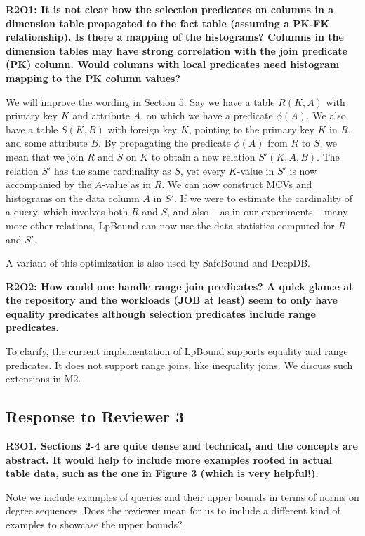 \vspace{0.5em}\noindent
\textbf{
R2O1: It is not clear how the selection predicates on columns in a dimension table propagated to the fact table (assuming a PK-FK relationship). Is there a mapping of the histograms? Columns in the dimension tables may have strong correlation with the join predicate (PK) column. Would columns with local predicates need histogram mapping to the PK column values? 
}

{
\color{blue}
We will improve the wording in Section 5. Say we have a table $R(K, A)$ with primary key $K$ and attribute $A$, on which we have a predicate $\phi(A)$. We also have a table $S(K,B)$ with foreign key $K$, pointing to the primary key $K$ in $R$, and some attribute $B$. By propagating the predicate $\phi(A)$ from $R$ to $S$, we mean that we join $R$ and $S$ on $K$ to obtain a new relation $S'(K,A,B)$. The relation $S'$ has the same cardinality as $S$, yet every $K$-value in $S'$ is now accompanied by the $A$-value as in $R$. We can now construct MCVs and histograms on the data column $A$ in $S'$. If we were to estimate the cardinality of a query, which involves both $R$ and $S$, and also -- as in our experiments -- many more other relations, LpBound can now use the data statistics computed for $R$ and $S'$.

A variant of this optimization is also used by SafeBound and DeepDB. 
}


\vspace{0.5em}\noindent
\textbf{
R2O2: How could one handle range join predicates? A quick glance at the repository and the workloads (JOB at least) seem to only have equality predicates although selection predicates include range predicates. 
}

{
\color{blue}
To clarify, the current implementation of LpBound supports equality and range predicates. It does not support range joins, like inequality joins. We discuss such extensions in M2.
}


\subsection*{Response to Reviewer 3} 

\vspace{0.5em}\noindent
\textbf{
R3O1. Sections 2-4 are quite dense and technical, and the concepts are abstract. It would help to include more examples rooted in actual table data, such as the one in Figure 3 (which is very helpful!). 
}

{
\color{blue}
Note we include examples of queries and their upper bounds in terms of norms on degree sequences. Does the reviewer mean for us to include a different kind of examples to showcase the upper bounds?
}



